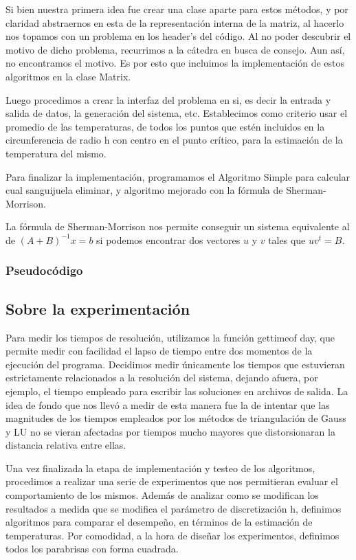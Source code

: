 Si bien nuestra primera idea fue crear una clase aparte para estos métodos, y por claridad abstraernos en esta de la 
representación interna de la matriz, al hacerlo nos topamos con un problema en los header's del código. Al no poder descubrir el motivo
de dicho problema, recurrimos a la cátedra en busca de consejo. Aun así, no encontramos el motivo. Es por esto que incluimos la implementación de
estos algoritmos en la clase Matrix. 

Luego procedimos a crear la interfaz del problema en si, es decir la entrada y salida de datos, la generación
del sistema, etc. Establecimos como criterio usar el promedio de las temperaturas, de todos los puntos que estén
incluidos en la circunferencia de radio h con centro en el punto crítico,
para la estimación de la temperatura del mismo. 

Para finalizar la implementación, programamos el Algoritmo Simple para calcular cual sanguijuela eliminar,
y algoritmo mejorado con la fórmula de Sherman-Morrison. 

La fórmula de Sherman-Morrison nos permite conseguir un sistema equivalente al de $(A+B)^{-1}x=b$ si podemos encontrar dos vectores $u$ y $v$
tales que $uv^t=B$.



\subsubsection{Pseudocódigo}

\subsection{Sobre la experimentación}

Para medir los tiempos de resolución, utilizamos la función gettimeof day, que permite medir con
facilidad el lapso de tiempo entre dos momentos de la ejecución del programa. Decidimos medir
únicamente los tiempos que estuvieran estrictamente relacionados a la resolución del sistema,
dejando afuera, por ejemplo, el tiempo empleado para escribir las soluciones en archivos de salida. La
idea de fondo que nos llevó a medir de esta manera fue la de intentar que las magnitudes de los tiempos
empleados por los métodos de triangulación de Gauss y LU no se vieran afectadas por tiempos mucho
mayores que distorsionaran la distancia relativa entre ellas.

Una vez finalizada la etapa de implementación y testeo de los algoritmos, procedimos a realizar una
serie de experimentos que nos permitieran evaluar el comportamiento de los mismos. Además de
analizar como se modifican los resultados a medida que se modifica el parámetro de discretización
h, definimos algoritmos para comparar el desempeño, en términos de la estimación de temperaturas.
Por comodidad, a la hora de diseñar los experimentos, definimos todos los parabrisas con forma cuadrada.

